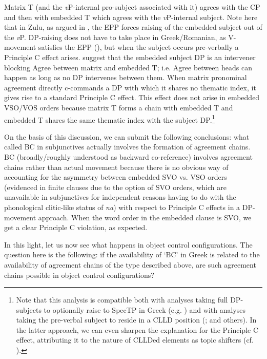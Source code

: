 \documentclass[output=paper]{langsci/langscibook}
\begin{document}
Matrix T (and the \textit{v}P-internal pro-subject associated with it) agrees with the CP and then with embedded T which agrees with the \textit{v}P-internal subject. Note here that in Zulu, as argued in \citet{Halpert2016}, the EPP forces raising of the embedded subject out of the \textit{v}P. DP-raising does not have to take place in Greek\slash Romanian, as V-movement satisfies the EPP (\citealt{Alexiadou1998}), but when the subject occurs pre-verbally a Principle C effect arises. \citet{Tsakali2017} suggest that the embedded subject DP is an intervener blocking Agree between matrix and embedded T; i.e. Agree between heads can happen as long as no DP intervenes between them. When matrix pronominal agreement directly c-commands a DP with which it shares no thematic index, it gives rise to a standard Principle C effect. This effect does not arise in embedded VSO\slash VOS orders because matrix T forms a chain with embedded T and embedded T shares the same thematic index with the subject DP.\footnote{Note that this analysis is compatible both with analyses taking full DP-subjects to optionally raise to SpecTP in Greek (e.g. \citealt{Spyropoulos2009}) and with analyses taking the pre-verbal subject to reside in a CLLD position (\citealt{Alexiadou1998}; \citealt{Barbosa2009} and others). In the latter approach, we can even sharpen the explanation for the Principle C effect, attributing it to the nature of CLLDed elements as topic shifters (cf. \citealt{Frascarelli2007}).}   

On the basis of this discussion, we can submit the following conclusions: what \citet{Alexiadou2010} called BC in subjunctives actually involves the formation of agreement chains. BC (broadly\slash roughly understood as backward co-reference) involves agreement chains rather than actual movement because there is no obvious way of accounting for the asymmetry between embedded SVO vs. VSO orders (evidenced in finite clauses due to the option of SVO orders, which are unavailable in subjunctives for independent reasons having to do with the phonological clitic-like status of \textit{na}) with respect to Principle C effects in a DP-movement approach. When the word order in the embedded clause is SVO, we get a clear Principle C violation, as expected.

In this light, let us now see what happens in object control configurations. The question here is the following: if the availability of ‘BC’ in Greek is related to the availability of agreement chains of the type described above, are such agreement chains possible in object control configurations?
\end{document}
